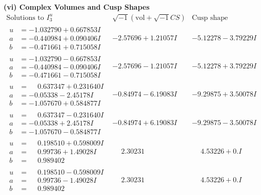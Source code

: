 \documentclass[1p]{elsarticle_modified}
\theoremstyle{definition}
\newcommand{\I}{\sqrt{-1}}
\begin{document}
\newpage\flushleft \textbf{(vi) Complex Volumes and Cusp Shapes}
$$\begin{array}{c|c|c}  
\text{Solutions to }I^u_{3}& \I (\text{vol} + \sqrt{-1}CS) & \text{Cusp shape}\\
 \hline 
\begin{aligned}
u &= -1.032790 + 0.667853 I \\
a &= -0.440984 + 0.090406 I \\
b &= -0.471661 + 0.715058 I\end{aligned}
 & -2.57696 + 1.21057 I & -5.12278 - 3.79229 I \\ \hline\begin{aligned}
u &= -1.032790 - 0.667853 I \\
a &= -0.440984 - 0.090406 I \\
b &= -0.471661 - 0.715058 I\end{aligned}
 & -2.57696 - 1.21057 I & -5.12278 + 3.79229 I \\ \hline\begin{aligned}
u &= \phantom{-}0.637347 + 0.231640 I \\
a &= -0.05338 - 2.45178 I \\
b &= -1.057670 + 0.584877 I\end{aligned}
 & -0.84974 - 6.19083 I & -9.29875 + 3.50078 I \\ \hline\begin{aligned}
u &= \phantom{-}0.637347 - 0.231640 I \\
a &= -0.05338 + 2.45178 I \\
b &= -1.057670 - 0.584877 I\end{aligned}
 & -0.84974 + 6.19083 I & -9.29875 - 3.50078 I \\ \hline\begin{aligned}
u &= \phantom{-}0.198510 + 0.598009 I \\
a &= \phantom{-}0.99736 + 1.49028 I \\
b &= \phantom{-}0.989402\phantom{ +0.000000I}\end{aligned}
 & \phantom{-}2.30231\phantom{ +0.000000I} & \phantom{-}4.53226 + 0. I\phantom{ +0.000000I} \\ \hline\begin{aligned}
u &= \phantom{-}0.198510 - 0.598009 I \\
a &= \phantom{-}0.99736 - 1.49028 I \\
b &= \phantom{-}0.989402\phantom{ +0.000000I}\end{aligned}
 & \phantom{-}2.30231\phantom{ +0.000000I} & \phantom{-}4.53226 + 0. I\phantom{ +0.000000I} \\ \hline\begin{aligned}

\end{aligned}
\end{array}$$
\end{document}
